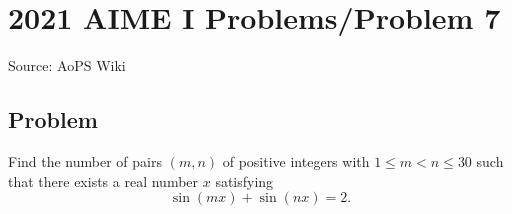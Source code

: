 \documentclass[12pt]{article}
\begin{document}
\section*{{2021 AIME I Problems/Problem 7}}
Source: AoPS Wiki

\subsection*{Problem}
Find the number of pairs $(m,n)$ of positive integers with $1\le m<n\le 30$ such that there exists a real number $x$ satisfying \[\sin(mx)+\sin(nx)=2.\]
\end{document}
